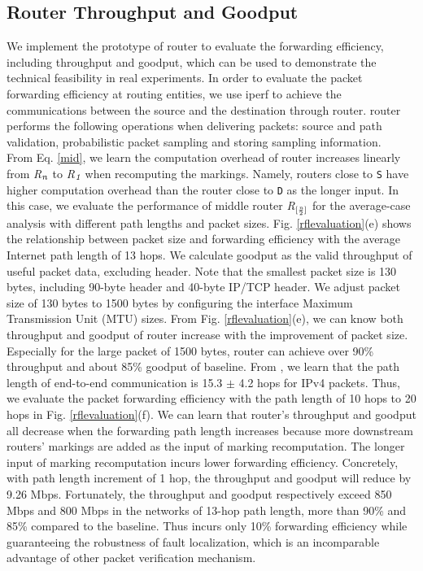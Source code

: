 \subsection{Router Throughput and Goodput}
\label{routerthroughput}
We implement the prototype of \name{} router to evaluate the forwarding efficiency, including throughput and goodput, which can be used to demonstrate the technical feasibility in real experiments.
In order to evaluate the packet forwarding efficiency at routing entities, we use iperf \cite{tirumala2005iperf} to achieve the communications between the source and the destination through \name{} router. \name{} router performs the following operations when delivering packets: source and path validation, probabilistic packet sampling and storing sampling information. \\
\indent
From Eq. \ref{mid}, we learn the computation overhead of \name{} router increases linearly from \emph{R}$_\emph{n}$ to \emph{R}$_\emph{1}$ when recomputing the markings. Namely, \name{} routers close to {\tt S} have higher computation overhead than the router close to {\tt D} as the longer input. In this case, we evaluate the performance of middle router \emph{R}$_{[\frac{\emph{n}}{2}]}$ for the average-case analysis with different path lengths and packet sizes. Fig. \ref{rflevaluation}(e) shows the relationship between packet size and forwarding efficiency with the average Internet path length of 13 hops. We calculate goodput as the valid throughput of useful packet data, excluding \name{} header. Note that the smallest packet size is 130 bytes, including 90-byte \name{} header and 40-byte IP/TCP header. We adjust packet size of 130 bytes to 1500 bytes by configuring the interface Maximum Transmission Unit (MTU) sizes. From Fig. \ref{rflevaluation}(e), we can know both throughput and goodput of \name{} router increase with the improvement of packet size. Especially for the large packet of 1500 bytes, \name{} router can achieve over 90\% throughput and about 85\% goodput of baseline. From \cite{huffaker2002distance}, we learn that the path length of end-to-end communication is 15.3 $\pm$ 4.2 hops for IPv4 packets. Thus, we evaluate the packet forwarding efficiency with the path length of 10 hops to 20 hops in Fig. \ref{rflevaluation}(f). We can learn that \name{} router's throughput and goodput all decrease when the forwarding path length increases because more downstream routers' markings are added as the input of marking recomputation. The longer input of marking recomputation incurs lower forwarding efficiency. Concretely, with path length increment of 1 hop, the throughput and goodput will reduce by 9.26 Mbps. Fortunately, the throughput and goodput respectively exceed 850 Mbps and 800 Mbps in the networks of 13-hop path length, more than 90\% and 85\% compared to the baseline. Thus \name{} incurs only 10\% forwarding efficiency while guaranteeing the robustness of fault localization, which is an incomparable advantage of other packet verification mechanism.
